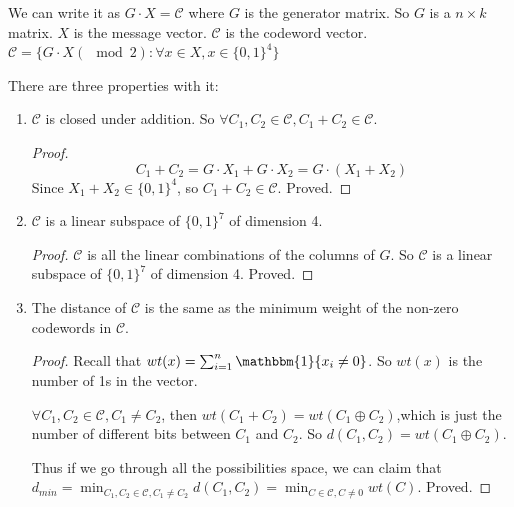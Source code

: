 \documentclass[letterpaper,12pt]{article}
\begin{document}
We can write it as $G\cdot X=\mathcal{C}$ where $G$ is the generator matrix. So
$G$ is a $n\times k$ matrix. $X$ is the message vector. $\mathcal{C}$ is the
codeword vector. $\mathcal{C}=\{G\cdot X (\mod 2): \forall x \in X, x\in
    \{0,1\}^4\}$

There are three properties with it:\begin{enumerate}
    \item $\mathcal{C}$ is closed under addition. So $\forall C_1,C_2\in \mathcal{C}, C_1+C_2\in \mathcal{C}$.\begin{proof}
              \[
                  C_1+C_2 = G\cdot X_1+G\cdot X_2 = G\cdot (X_1+X_2)
              \]
              Since $X_1+X_2\in \{0,1\}^4$, so $C_1+C_2\in \mathcal{C}$. Proved.
          \end{proof}
    \item $\mathcal{C}$ is a linear subspace of $\{0,1\}^7$ of dimension 4. \begin{proof}
              $\mathcal{C}$ is all the linear combinations of the columns of $G$. So $\mathcal{C}$ is a linear subspace of $\{0,1\}^7$ of dimension 4. Proved.
          \end{proof}
    \item The distance of $\mathcal{C}$ is the same as the minimum weight of the non-zero
          codewords in $\mathcal{C}$.\begin{proof}
              Recall that $wt(x)=\sum_{i=1}^{n}\mathbbm{1}\{x_i\neq 0\}$. So $wt(x)$ is the number of 1s in the vector.

              $\forall C_1,C_2\in \mathcal{C}, C_1\neq C_2$, then $wt(C_1+C_2)=wt(C_1 \oplus C_2)$,which is just the number of different bits between $C_1$ and $C_2$. So $d(C_1,C_2)=wt(C_1 \oplus C_2)$.

              Thus if we go through all the possibilities space, we can claim that
              $d_{min}=\min_{C_1, C_2\in \mathcal{C}, C_1\neq C_2}d(C_1, C_2)=\min_{C\in
                      \mathcal{C}, C\neq 0}wt(C)$. Proved.
          \end{proof}
\end{enumerate}
\end{document}
